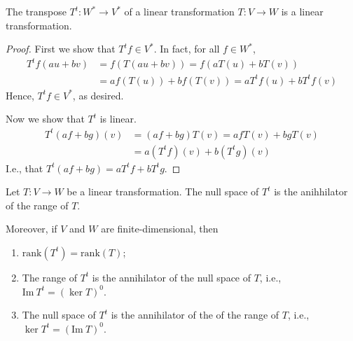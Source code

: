 \begin{theorem}
	The transpose $T^t : W^\ast \longrightarrow V^\ast$ of a linear transformation $T : V \longrightarrow W$ is a linear transformation.
\end{theorem}

\begin{proof}
	First we show that $T^t f \in V^\ast$. In fact, for all $f \in W^\ast$,
	\begin{equation*}
		\begin{aligned}
			T^t f(au+bv) &= f(T(au+bv)) = f(aT(u) + bT(v)) \\
			&= af(T(u)) + bf(T(v)) = aT^t f(u) + bT^t f(v)
		\end{aligned}
	\end{equation*}
	Hence, $T^t f \in V^\ast$, as desired.
	
	Now we show that $T^t$ is linear.
	\begin{equation*}
		\begin{aligned}
			T^t (af+bg)(v) &= (af+bg)T(v) = afT(v) + bgT(v) \\
			&= a(T^tf)(v) + b(T^t g)(v)
		\end{aligned}
	\end{equation*}
	I.e., that $T^t(af+bg) = aT^tf + bT^t g$.
\end{proof}


\begin{theorem}
	Let $T : V \longrightarrow W$ be a linear transformation. The null space of $T^t$ is the anihhilator of the range of $T$.
	
	Moreover, if $V$ and $W$ are finite-dimensional, then
	\begin{enumerate}
		\item $\text{rank}(T^t) = \text{rank}(T)$;
		\item The range of $T^t$ is the annihilator of the null space of $T$, i.e., $\text{Im}~T^t = (\ker T)^0$.
		\item The null space of $T^t$ is the annihilator of the of the range of $T$, i.e., $\ker T^t = (\text{Im}~T)^0$.
	\end{enumerate}
\end{theorem}

